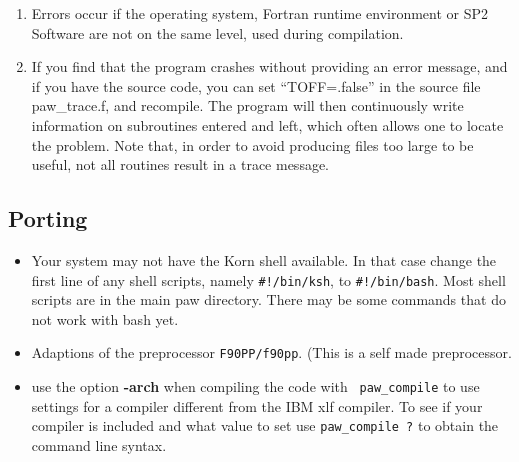 \documentclass[final,12pt]{article}
\begin{document}
{{{\begin{enumerate}
  Library should give a useful message (affects only the parallel
  version).
\item Errors occur if the operating system, Fortran runtime
  environment or SP2 Software are not on the same level, 
  used during compilation.
\item If you find that the program crashes without providing an error
  message, and if you have the source code, you can set
  ``TOFF=.false'' in the source file paw\_trace.f, and recompile. The
  program will then continuously write information on subroutines
  entered and left, which often allows one to locate the problem. Note that, in
  order to avoid producing files too large to be useful, not all
  routines result in a trace message.   %
\end{enumerate}

\subsection{Porting}
\begin{itemize}
\item Your system may not have the Korn shell available. In that case
  change the first line of any shell scripts, namely {\tt \#!/bin/ksh}, to
    {\tt \#!/bin/bash}. Most shell scripts are in the main paw directory.
   There may be some commands that do not work with bash yet.
\item Adaptions of the preprocessor {\tt F90PP/f90pp}. (This is a self
  made preprocessor.
\item use the option {\bf -arch} when compiling the code with {\tt
    paw\_compile} to use settings for a compiler different from the
  IBM xlf compiler. To see if your compiler is included and what value
  to set use {\tt paw\_compile ?} to obtain the command line syntax.
\end{itemize}

}}}
\end{document}
